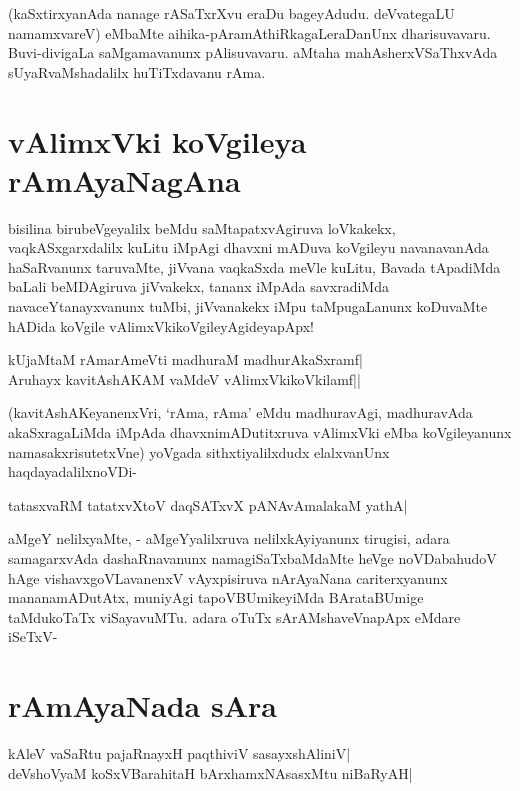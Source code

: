 (kaSxtirxyanAda nanage rASaTxrXvu eraDu bageyAdudu. deVvategaLU namamxvareV) eMbaMte aihika-pAramAthiRkagaLeraDanUnx dharisuvavaru. Buvi-divigaLa saMgamavanunx pAlisuvavaru. aMtaha mahAsherxVSaThxvAda sUyaRvaMshadalilx huTiTxdavanu rAma. 

\section*{vAlimxVki koVgileya rAmAyaNagAna} 

bisilina birubeVgeyalilx beMdu saMtapatxvAgiruva loVkakekx, vaqkASxgarxdalilx kuLitu iMpAgi dhavxni mADuva koVgileyu navanavanAda haSaRvanunx taruvaMte, jiVvana vaqkaSxda meVle kuLitu, Bavada tApadiMda baLali beMDAgiruva jiVvakekx, tananx iMpAda savxradiMda navaceYtanayxvanunx tuMbi, jiVvanakekx iMpu taMpugaLanunx koDuvaMte hADida koVgile vAlimxVkikoVgileyAgideyapApx! 

\begin{shloka} 
kUjaMtaM rAmarAmeVti madhuraM madhurAkaSxramf|\label{148}\\ 
Aruhayx kavitAshAKAM vaMdeV vAlimxVkikoVkilamf||
\end{shloka} 

(kavitAshAKeyanenxVri, `rAma, rAma' eMdu madhuravAgi, madhuravAda akaSxragaLiMda iMpAda dhavxnimADutitxruva vAlimxVki eMba koVgileyanunx namasakxrisutetxVne) yoVgada sithxtiyalilxdudx elalxvanUnx haqdayadalilxnoVDi- 

\begin{shloka} 
tatasxvaRM tatatxvXtoV daqSATxvX pANAvAmalakaM yathA|\label{149}
\end{shloka}

aMgeY nelilxyaMte, - aMgeYyalilxruva nelilxkAyiyanunx tirugisi, adara samagarxvAda dashaRnavanunx namagiSaTxbaMdaMte heVge noVDabahudoV hAge vishavxgoVLavanenxV vAyxpisiruva nArAyaNana cariterxyanunx mananamADutAtx, muniyAgi tapoVBUmikeyiMda BArataBUmige taMdukoTaTx viSayavuMTu. adara oTuTx sArAMshaveVnapApx eMdare iSeTxV- 

\section*{rAmAyaNada sAra} 

\begin{shloka} 
kAleV vaSaRtu pajaRnayxH paqthiviV sasayxshAliniV|\label{149a}\\ 
deVshoV\s yaM koSxVBarahitaH bArxhamxNAsasxMtu niBaRyAH|
\end{shloka} 

